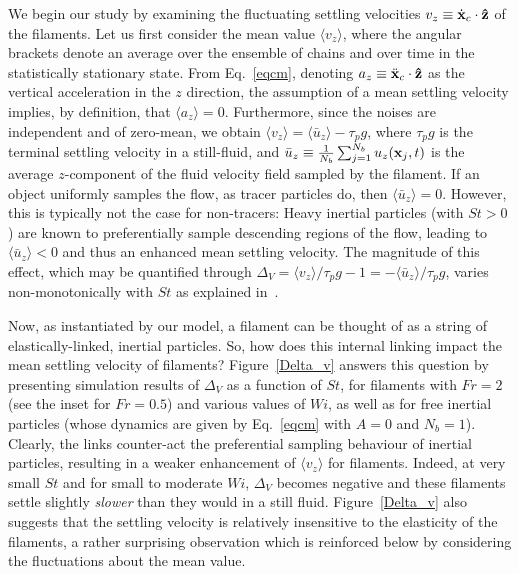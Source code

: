 \documentclass[aps,prl,twocolumn,superscriptaddress,floatfix,tightenlines,showpacs,notitlepage]{revtex4-1}
\begin{document}
We begin our study
by examining the fluctuating settling velocities $v_z \equiv \dot{{\bf
x}}_c\cdot {\bf \hat z}$ of the filaments. Let us first consider the mean value 
$\langle v_z \rangle$, where the angular brackets
denote an average over the ensemble of chains and over time in the statistically stationary state. From Eq.~\eqref{eqcm}, denoting $a_z \equiv \ddot{{\bf x}}_c\cdot {\bf \hat z}$ as the vertical 
acceleration in the $z$ direction, the assumption of a mean settling velocity implies, by definition, that
$\langle a_z \rangle = 0$. Furthermore, since the noises are independent and of zero-mean,  we obtain
$\langle v_z \rangle = \langle \bar{u}_z \rangle - \tau_p g$, where $\tau_p g$ is the terminal settling velocity in a still-fluid, and $\bar{u}_z \equiv \frac{1}{N_b}\sum_{j=1}^{N_b}u_z({\bf x}_j,t)$ 
is the average $z$-component of the fluid velocity field sampled by the filament. If an object uniformly samples the flow, as tracer particles do, then $\langle \bar{u}_z \rangle = 0$. However, this is typically not the case for non-tracers: Heavy inertial particles (with $St > 0$) are known to preferentially sample descending regions of the flow, leading to $\langle \bar{u}_z \rangle < 0$ and thus an enhanced mean settling velocity. The magnitude of this effect, which may be quantified through $\Delta_V = \langle v_z \rangle/\tau_p g-1 =- \langle \bar{u}_z \rangle/\tau_p g$,  varies non-monotonically with $St$ as explained in~\citep{Bec_gravity}. 

Now, as instantiated by our model, a filament can be thought of as a string of elastically-linked, inertial particles. So, how does this internal linking impact the mean settling velocity of filaments? Figure~\ref{Delta_v} answers this question by presenting simulation results of $\Delta_V$ as a function of $St$, for filaments with $Fr = 2$ (see the inset for $Fr = 0.5$) and various values of $Wi$, as well as for free inertial particles (whose dynamics are given by Eq.~\eqref{eqcm} with $A=0$ and $N_b = 1$). Clearly, the links counter-act the preferential sampling behaviour of inertial particles, resulting in a weaker enhancement of $\langle v_z \rangle$ for filaments. Indeed, at very small $St$ and for small to moderate $Wi$, $\Delta_V$ becomes negative and these filaments settle slightly \textit{slower} than they would in a still fluid. Figure~\ref{Delta_v} also suggests that the settling velocity is relatively insensitive to the elasticity of the filaments, a rather surprising observation which is reinforced below by considering the fluctuations about the mean value.
\end{document}
